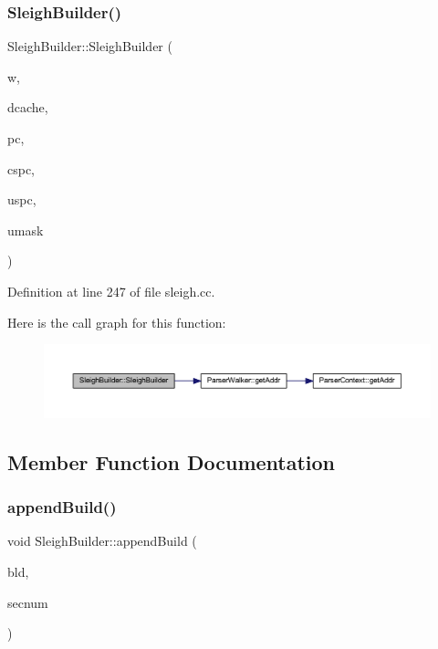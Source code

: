 \subsubsection{\texorpdfstring{SleighBuilder()}{SleighBuilder()}}
{\footnotesize\ttfamily Sleigh\+Builder\+::\+Sleigh\+Builder (\begin{DoxyParamCaption}\item[{\mbox{\hyperlink{class_parser_walker}{Parser\+Walker}} $\ast$}]{w,  }\item[{\mbox{\hyperlink{class_disassembly_cache}{Disassembly\+Cache}} $\ast$}]{dcache,  }\item[{\mbox{\hyperlink{class_pcode_cacher}{Pcode\+Cacher}} $\ast$}]{pc,  }\item[{\mbox{\hyperlink{class_addr_space}{Addr\+Space}} $\ast$}]{cspc,  }\item[{\mbox{\hyperlink{class_addr_space}{Addr\+Space}} $\ast$}]{uspc,  }\item[{uint4}]{umask }\end{DoxyParamCaption})}



Definition at line 247 of file sleigh.\+cc.

Here is the call graph for this function\+:
\nopagebreak
\begin{figure}[H]
\begin{center}
\leavevmode
\includegraphics[width=350pt]{class_sleigh_builder_a6e8bed145454790630677c55bd3250bb_cgraph}
\end{center}
\end{figure}


\subsection{Member Function Documentation}
\mbox{\label{class_sleigh_builder_a9e9d6b0de400f9aa14caf2732b7bfeef}} 
\subsubsection{\texorpdfstring{appendBuild()}{appendBuild()}}
{\footnotesize\ttfamily void Sleigh\+Builder\+::append\+Build (\begin{DoxyParamCaption}\item[{\mbox{\hyperlink{class_op_tpl}{Op\+Tpl}} $\ast$}]{bld,  }\item[{int4}]{secnum }\end{DoxyParamCaption})\hspace{0.3cm}{\ttfamily [virtual]}}



